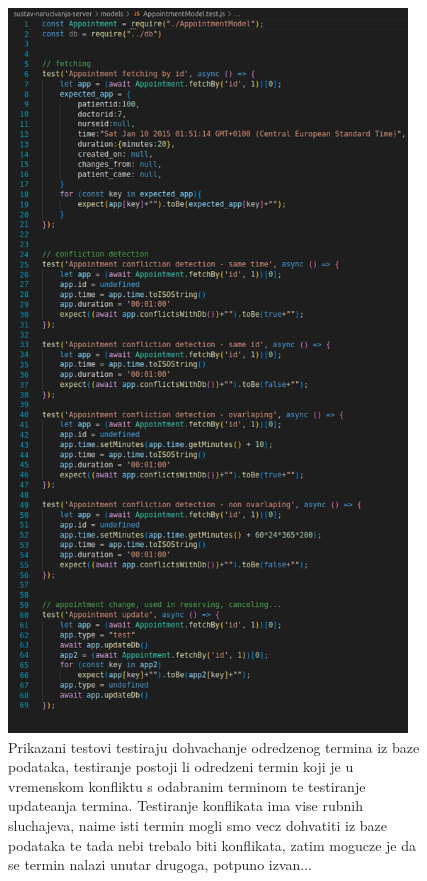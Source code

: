             \begin{figure}[H]
                    \includegraphics[width=300pt]{slike/appointment_tests_code.png} %
                    \caption{Prikazani testovi testiraju dohvachanje odredzenog termina iz baze podataka, testiranje postoji li odredzeni termin koji je u vremenskom konfliktu s odabranim terminom te testiranje updateanja termina. Testiranje konflikata ima vise rubnih sluchajeva, naime isti termin mogli smo vecz dohvatiti iz baze podataka te tada nebi trebalo biti konflikata, zatim mogucze je da se termin nalazi unutar drugoga, potpuno izvan...}
                    \label{fig:struktura} %
                \end{figure}

